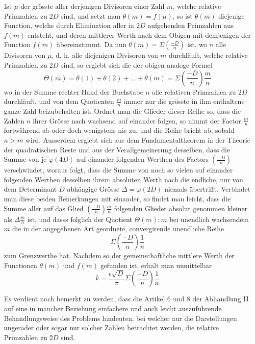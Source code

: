 Ist $\mu$ der grösste aller derjenigen Divisoren einer Zahl $m$, welche relative Primzahlen zu $2D$ sind, und setzt man $\theta(m)=f(\mu)$, so ist $\theta(m)$ diejenige Function, welche durch Elimination aller in $2D$ aufgehenden Primzahlen aus $f(m)$ entsteht, und deren mittlerer Werth nach dem Obigen mit demjenigen der Function $f(m)$ übereinstimmt. Da nun $\theta(m)=\Sigma\left(\frac{-D}n\right)$ ist, wo $n$ alle Divisoren von $\mu$, d. h. alle diejenigen Divisoren von $m$ durchläuft, welche relative Primzahlen zu $2D$ sind, so ergiebt sich die der obigen analoge Formel
\[
\Theta(m)=\theta(1)+\theta(2)+\ldots+\theta(m)=\Sigma\left(\frac{-D}n\right)\frac mn
\]
wo in der Summe rechter Hand der Buchstabe $n$ alle relativen Primzahlen zu $2D$ durchläuft, und von dem Quotienten $\frac mn$ immer nur die grösste in ihm enthaltene ganze Zahl beizubehalten ist. Ordnet man die Glieder dieser Reihe so, dass die Zahlen $n$ ihrer Grösse nach wachsend auf einander folgen, so nimmt der Factor $\frac mn$ fortwährend ab oder doch wenigstens nie zu, und die Reihe bricht ab, sobald $n>m$ wird. Ausserdem ergiebt sich aus dem Fundamentaltheorem in der Theorie der quadratischen Reste und aus der Verallgemeinerung desselben, dass die Summe von je $\varphi(4D)$ auf einander folgenden Werthen des Factors $\left(\frac{-D}n\right)$ verschwindet, woraus folgt, dass die Summe von noch so vielen auf einander folgenden Werthen
%
desselben ihrem absoluten Werth nach die endliche, nur von dem Determinant $D$ abhängige Grösse $\Delta=\varphi(2D)$ niemals übertrifft. Verbindet man diese beiden Bemerkungen mit einander, so findet man leicht, dass die Summe aller auf das Glied $\left(\frac{-D}n\right)\frac mn$ folgenden Glieder absolut genommen kleiner als $\Delta\frac mn$ ist, und dasss folglich der Quotient $\Theta(m):m$ bei unendlich wachsendem $m$ die in der angegebenen Art geordnete, convergirende unendliche Reihe
\[
\Sigma\left(\frac{-D}n\right)\frac1n
\]
zum Grenzwerthe hat. Nachdem so der gemeinschaftliche mittlere Werth der Functionen $\theta(m)$ und $f(m)$ gefunden ist, erhält man unmittelbar
\[
k=\frac{\epsilon\surd D}\pi\Sigma\left(\frac{-D}n\right)\frac1n
\]

Es verdient noch bemerkt zu werden, dass die Artikel 6 und 8 der Abhandlung II auf eine in mancher Beziehung einfachere und auch leicht auszuführende Behandlungsweise des Problems hindeuten, bei welcher nur die Darstellungen ungerader oder sogar nur solcher Zahlen betrachtet werden, die relative Primzahlen zu $2D$ sind.
\BookRule{35mm}

